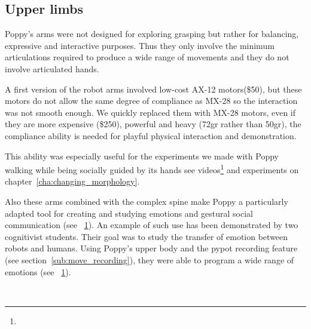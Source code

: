 \subsection{Upper limbs} %

Poppy's arms were not designed for exploring grasping but rather for balancing, expressive and interactive purposes. Thus they only involve the minimum articulations required to produce a wide range of movements and they do not involve articulated hands.

A first version of the robot arms involved low-cost AX-12 motors(\$50), but these motors do not allow the same degree of compliance as MX-28 so the interaction was not smooth enough. We quickly replaced them with MX-28 motors, even if they are more expensive (\$250), powerful and heavy (72gr rather than 50gr), the compliance ability is needed for playful physical interaction and demonstration.

This ability was especially useful for the experiments we made with Poppy walking while being socially guided by its hands see videos\footnote{} and experiments on chapter~\ref{cha:changing_morphology}.

Also these arms combined with the complex spine make Poppy a particularly adapted tool for creating and studying emotions and gestural social communication (see \figurename~\ref{fig:TER_cognitic}). An example of such use has been demonstrated by two cognitivist students. Their goal was to study the transfer of emotion between robots and humans. Using Poppy's upper body and the pypot recording feature (see section~\ref{sub:move_recording}), they were able to program a wide range of emotions (see \figurename~\ref{fig:TER_cognitic}).


\begin{figure}[tb]
\centering
    \hfil
    \\
    \hfil
    \caption{}
    \label{fig:TER_cognitic}
\end{figure}


